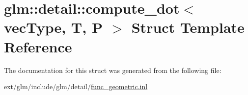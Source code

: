 \hypertarget{structglm_1_1detail_1_1compute__dot}{\section{glm\-:\-:detail\-:\-:compute\-\_\-dot$<$ vec\-Type, T, P $>$ Struct Template Reference}
\label{structglm_1_1detail_1_1compute__dot}
}


The documentation for this struct was generated from the following file\-:\begin{DoxyCompactItemize}
\item 
ext/glm/include/glm/detail/\hyperlink{func__geometric_8inl}{func\-\_\-geometric.\-inl}\end{DoxyCompactItemize}
